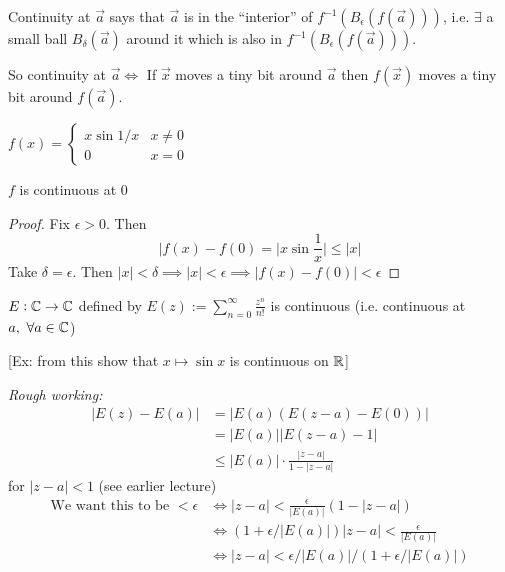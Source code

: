\documentclass[twoside]{scrartcl}
\begin{document}
Continuity at $\vec{a}$ says that $\vec{a}$ is in the ``interior'' of $f^{-1}(B_\epsilon (f(\vec{a})))$, i.e. $\exists$ a small ball $B_\delta (\vec{a})$ around it which is also in $f^{-1}(B_\epsilon(f(\vec{a})))$. 

So continuity at $\vec{a} \iff$ If $\vec{x}$ moves a tiny bit around $\vec{a}$ then $f(\vec{x})$ moves a tiny bit around $f(\vec{a})$.\pagebreak

\begin{example}
$f(x) = \begin{cases}
 	x\sin 1/x & x \neq 0\\
 	0 & x = 0
 \end{cases}$

\begin{center}
\end{center}


\begin{proposition}
$f$ is continuous at $0$	
\end{proposition}

\begin{proof}
Fix $\epsilon >0$. Then 
\[|f(x) - f(0) = |x\sin\frac{1}{x}| \leq |x|\]
Take $\delta = \epsilon$. Then $|x| < \delta \implies |x| < \epsilon \implies |f(x) - f(0)| < \epsilon$	
\end{proof}
\end{example}\vspace*{5pt}

\begin{proposition}
$E: \mathbb{C} \to \mathbb{C}$ defined by $E(z) := \sum_{n=0}^{\infty} \frac{z^n}{n!}$ is continuous (i.e. continuous at $a,~\forall a \in\mathbb{C}$)	
\end{proposition}
[Ex: from this show that $x \mapsto \sin x$ is continuous on $\mathbb{R}$]

\emph{Rough working:} 
\[\begin{aligned}
|E(z) - E(a)| &= |E(a)(E(z-a)-E(0))| \\ 	
&= |E(a)| |E(z-a) -1|\\
& \leq |E(a)| \cdot \frac{|z-a|}{1-|z-a|}
\end{aligned}
\]
for $|z-a| < 1$ (see earlier lecture)
\[\begin{aligned}
\text{We want this to be } < \epsilon &\iff |z-a| < \frac{\epsilon}{|E(a)|}(1-|z-a|)\\
&\iff (1 + \epsilon/|E(a)|)|z-a| < \frac{\epsilon}{|E(a)|}\\
&\iff |z-a| < \epsilon/|E(a)|/(1 + \epsilon/|E(a)|)
\end{aligned}
\]
\end{document}

